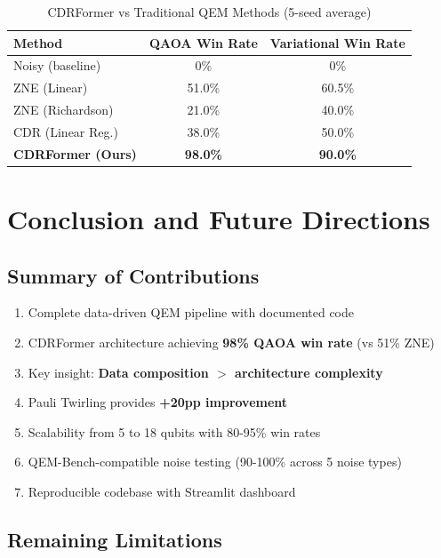 \documentclass[11pt, a4paper]{article}
\begin{document}
\begin{table}[H]
\centering
\caption{CDRFormer vs Traditional QEM Methods (5-seed average)}
\begin{tabular}{@{}lcc@{}}
\toprule
\textbf{Method} & \textbf{QAOA Win Rate} & \textbf{Variational Win Rate} \\ \midrule
Noisy (baseline) & 0\% & 0\% \\
ZNE (Linear) & 51.0\% & 60.5\% \\
ZNE (Richardson) & 21.0\% & 40.0\% \\
CDR (Linear Reg.) & 38.0\% & 50.0\% \\
\textbf{CDRFormer (Ours)} & \textbf{98.0\%} & \textbf{90.0\%} \\
\bottomrule
\end{tabular}
\end{table}

\section{Conclusion and Future Directions}

\subsection{Summary of Contributions}

\begin{enumerate}
    \item Complete data-driven QEM pipeline with documented code
    \item CDRFormer architecture achieving \textbf{98\% QAOA win rate} (vs 51\% ZNE)
    \item Key insight: \textbf{Data composition $>$ architecture complexity}
    \item Pauli Twirling provides \textbf{+20pp improvement}
    \item Scalability from 5 to 18 qubits with 80-95\% win rates
    \item QEM-Bench-compatible noise testing (90-100\% across 5 noise types)
    \item Reproducible codebase with Streamlit dashboard
\end{enumerate}

\subsection{Remaining Limitations}
\end{document}
